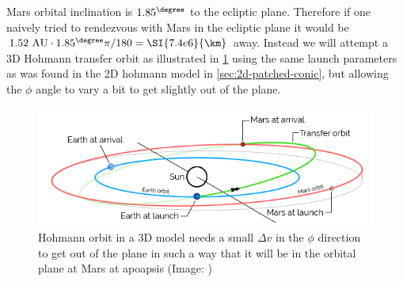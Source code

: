Mars orbital inclination is $1.85^\degree$ to the ecliptic plane. Therefore if one naively tried to rendezvous with Mars in the ecliptic plane it would be \( 1.52\ \text{AU} \cdot 1.85^\degree \pi / 180 = \SI{7.4e6}{\km} \) away. Instead we will attempt a 3D Hohmann transfer orbit as illustrated in \cref{fig:hohmann-transfer-orbit-3D} using the same launch parameters as was found in the 2D hohmann model in \cref{sec:2d-patched-conic}, but allowing the \(\phi\) angle to vary a bit to get slightly out of the plane.

\begin{figure}[ht]
    \centering
    \includegraphics[width=0.90\linewidth]{fig/hohmann-transfer-orbit-3D.png}
    \caption{Hohmann orbit in a 3D model needs a small $\Delta v$ in the $\phi$ direction to get out of the plane in such a way that it will be in the orbital plane at Mars at apoapsis (Image: \cite{Daedalis.de})}
    \label{fig:hohmann-transfer-orbit-3D}
\end{figure}
 